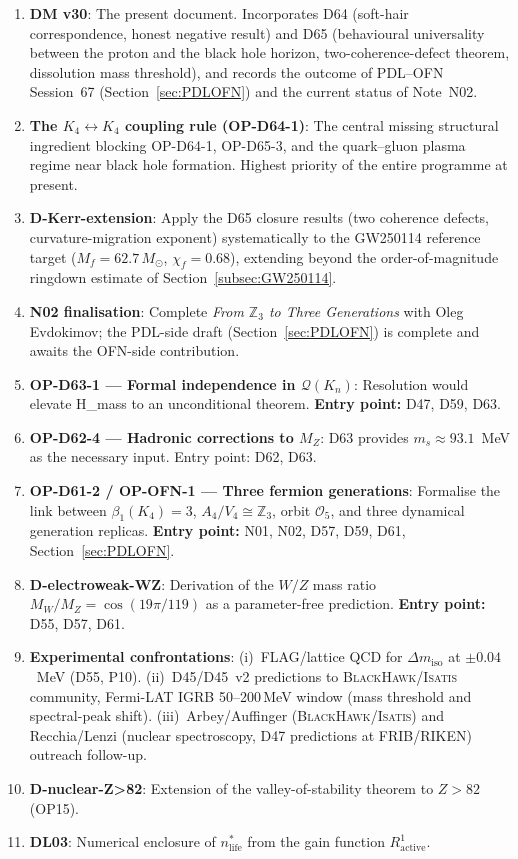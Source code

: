 \documentclass[11pt,a4paper]{article}
\theoremstyle{plain}
\theoremstyle{definition}
\theoremstyle{remark}
\begin{document}
\begin{enumerate}
\item \textbf{DM v30}: The present document. Incorporates D64 (soft-hair correspondence, honest negative result) and D65 (behavioural universality between the proton and the black hole horizon, two-coherence-defect theorem, dissolution mass threshold), and records the outcome of PDL--OFN Session~67 (Section~\ref{sec:PDLOFN}) and the current status of Note~N02.
\item \textbf{The $K_4\leftrightarrow K_4$ coupling rule (OP-D64-1)}: The central missing structural ingredient blocking OP-D64-1, OP-D65-3, and the quark--gluon plasma regime near black hole formation. Highest priority of the entire programme at present.
\item \textbf{D-Kerr-extension}: Apply the D65 closure results (two coherence defects, curvature-migration exponent) systematically to the GW250114 reference target ($M_f=62.7\,M_\odot$, $\chi_f=0.68$), extending beyond the order-of-magnitude ringdown estimate of Section~\ref{subsec:GW250114}.
\item \textbf{N02 finalisation}: Complete \emph{From $\mathbb{Z}_3$ to Three Generations} with Oleg Evdokimov; the PDL-side draft (Section~\ref{sec:PDLOFN}) is complete and awaits the OFN-side contribution.
\item \textbf{OP-D63-1 --- Formal independence in $\mathcal{Q}(K_n)$}: Resolution would elevate H\_mass to an unconditional theorem. \textbf{Entry point:} D47, D59, D63.
\item \textbf{OP-D62-4 --- Hadronic corrections to $M_Z$}: D63 provides $m_s \approx 93.1$~MeV as the necessary input. Entry point: D62, D63.
\item \textbf{OP-D61-2 / OP-OFN-1 --- Three fermion generations}: Formalise the link between $\beta_1(K_4) = 3$, $A_4/V_4 \cong \mathbb{Z}_3$, orbit $\mathcal{O}_5$, and three dynamical generation replicas. \textbf{Entry point:} N01, N02, D57, D59, D61, Section~\ref{sec:PDLOFN}.
\item \textbf{D-electroweak-WZ}: Derivation of the $W/Z$ mass ratio $M_W/M_Z = \cos(19\pi/119)$ as a parameter-free prediction. \textbf{Entry point:} D55, D57, D61.
\item \textbf{Experimental confrontations}: (i)~FLAG/lattice QCD for $\Delta m_{\mathrm{iso}}$ at $\pm 0.04$~MeV (D55, P10). (ii)~D45/D45~v2 predictions to \textsc{BlackHawk}/\textsc{Isatis} community, Fermi-LAT IGRB 50--200\,MeV window (mass threshold and spectral-peak shift). (iii)~Arbey/Auffinger (\textsc{BlackHawk}/\textsc{Isatis}) and Recchia/Lenzi (nuclear spectroscopy, D47 predictions at FRIB/RIKEN) outreach follow-up.
\item \textbf{D-nuclear-Z>82}: Extension of the valley-of-stability theorem to $Z>82$ (OP15).
\item \textbf{DL03}: Numerical enclosure of $n^*_{\mathrm{life}}$ from the gain function $R^1_{\mathrm{active}}$.
\end{enumerate}
\end{document}
